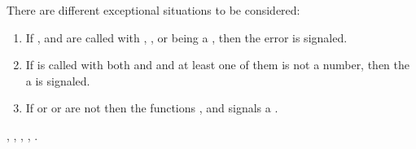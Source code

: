 \documentclass[../Exponentials-Logarithms-Trigonometry.tex]{subfiles}
\begin{document}
\DExceptional{}

There are different exceptional situations to be considered:
\begin{enumerate}
\item If ,  and  are called with
  , , or  being a
  , then the
   error is signaled.
\item If  is called with both  and
   and at least one of them is not a  number,
  then the a  is signaled.
\item If  or  or  are not \CL{}
   then the functions ,  and
   signals a .
\end{enumerate}

\DSeeAlso{}

\code{*}, \code{-}, , , .
\end{document}
